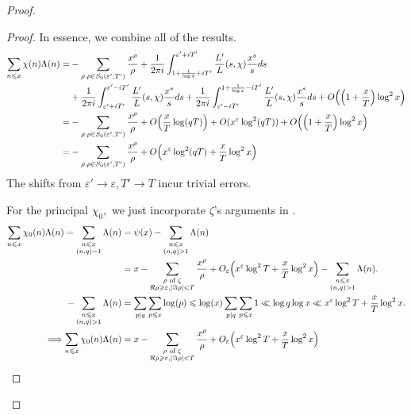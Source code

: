 \begin{proof}
\begin{proof}
In essence, we combine all of the results.
\begin{align*}
    \sum_{n \leqslant x} \chi(n)\Lambda(n) =& -\sum_{\rho: \rho \in S_0(\varepsilon', T')} \frac{x^\rho}{\rho} + \frac{1}{2 \pi i} \int_{1 + \frac{1}{\log x} + iT'}^{\varepsilon' + iT'} \frac{L'}{L}(s, \chi) \frac{x^s}{s} ds \\ 
    &+ \frac{1}{2 \pi i} \int_{\varepsilon' + iT'}^{\varepsilon' - iT'} \frac{L'}{L}(s, \chi) \frac{x^s}{s} ds + \frac{1}{2 \pi i} \int_{\varepsilon' - iT'}^{1 + \frac{1}{\log x} - iT'} \frac{L'}{L}(s, \chi) \frac{x^s}{s} ds + O\!\left( \left( 1+\frac{x}{T} \right) \log^2 x \right) \\
    =& -\sum_{\rho: \rho \in S_0(\varepsilon', T')} \frac{x^\rho}{\rho} + O\!\left( \frac{x}{T} \log(qT) \right) + O( x^\varepsilon \log^2(qT)) + O\!\left( \left( 1+\frac{x}{T} \right) \log^2 x \right) \\
    =& -\sum_{\rho: \rho \in S_0(\varepsilon', T')} \frac{x^\rho}{\rho} + O\!\left( x^\varepsilon \log^2(qT) + \frac{x}{T} \log^2 x \right)
\end{align*}
The shifts from $\varepsilon' \to \varepsilon, T' \to T$ incur trivial errors.

For the principal $\chi_0,$ we just incorporate $\zeta$'s arguments in \cite[Ch.~17]{Davenport}.
\begin{align*}
    \sum_{n \leqslant x} \chi_0(n) \Lambda(n) = \sum_{\substack{n \leqslant x \\ (n, q) = 1}} \Lambda(n) &= \psi(x) - \sum_{\substack{n \leqslant x \\ (n, q) > 1}} \Lambda(n) \\
    &= x - \sum_{\substack{\rho \text{ of } \zeta \\ \Re \rho \geqslant \varepsilon, \left\lvert \Im \rho \right\rvert < T}} \frac{x^\rho}{\rho} + O_\varepsilon \!\left( x^\varepsilon \log^2 T + \frac{x}{T} \log^2 x \right) - \sum_{\substack{n \leqslant x \\ (n, q) > 1}} \Lambda(n). \\
    -\sum_{\substack{n \leqslant x \\ (n, q) > 1}} \Lambda(n) &= \sum_{p|q} \sum_{p \leqslant x} \log(p) \leqslant \log(x) \sum_{p|q} \sum_{p \leqslant x} 1 \ll \log q \log x \ll x^\varepsilon \log^2 T + \frac{x}{T} \log^2 x. \\
    \Longrightarrow \sum_{n \leqslant x} \chi_0(n) \Lambda(n) &= x -\sum_{\substack{\rho \text{ of } \zeta \\ \Re \rho \geqslant \varepsilon, \left\lvert \Im \rho \right\rvert < T}} \frac{x^\rho}{\rho} + O_\varepsilon \!\left( x^\varepsilon \log^2 T + \frac{x}{T} \log^2 x \right)
\end{align*}
\end{proof}


\end{proof}
